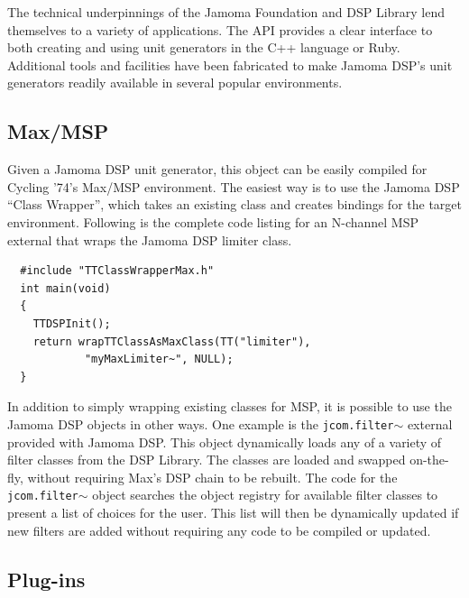 \documentclass[twoside,10pt]{article}
\begin{document}
The technical underpinnings of the Jamoma Foundation and DSP Library lend themselves to a variety of applications.  The API provides a clear interface to both creating and using unit generators in the C++ language or Ruby.  Additional tools and facilities have been fabricated to make Jamoma DSP's unit generators readily available in several popular environments.


\subsection{Max/MSP}

Given a Jamoma DSP unit generator, this object can be easily compiled for Cycling '74's Max/MSP environment.  The easiest way is to use the Jamoma DSP ``Class Wrapper'', which takes an existing class and creates bindings for the target environment. Following is the complete code listing for an N-channel MSP external that wraps the Jamoma DSP limiter class.

\begin{lstlisting}
  #include "TTClassWrapperMax.h"
  int main(void)
  {
    TTDSPInit();
    return wrapTTClassAsMaxClass(TT("limiter"), 
            "myMaxLimiter~", NULL);
  }
\end{lstlisting}

\noindent In addition to simply wrapping existing classes for MSP, it is possible to use the Jamoma DSP objects in other ways.  One example is the \texttt{\small{jcom.filter$\sim$}} external provided with Jamoma DSP.  
This object dynamically loads any of a variety of filter classes from the DSP Library.  The classes are loaded and swapped on-the-fly, without requiring Max's DSP chain to be rebuilt.  The code for the \texttt{\small{jcom.filter$\sim$}} object searches the object registry for available filter classes to present a list of choices for the user.  This list will then be dynamically updated if new filters are added without requiring any code to be compiled or updated.   


\subsection{Plug-ins}
\end{document}
